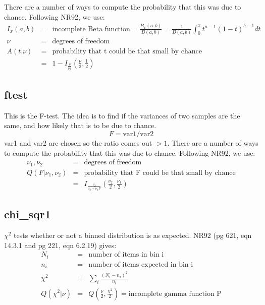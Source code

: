 There are a number of ways 
to compute the probability that this was due to chance.  Following
NR92, we use:
\begin{eqnarray}
    I_x(a,b) & = & \mbox{incomplete Beta function} 
               = \frac{B_x(a,b)}{B(a,b)}
               = \frac{1}{B(a,b)}\int_0^xt^{a-1}(1-t)^{b-1}dt\\
    \nu & = & \mbox{degrees of freedom}\\
    A(t|\nu) & = & \mbox{probability that t could be that small by chance}\\
             & = & 1- I_{\frac{\nu}{\nu_t^2}}(\frac{\nu}{2},\frac{1}{2})
\end{eqnarray}

\subsection*{ftest}
This is the F-test.  The idea is to find if the variances of two
samples are the same, and how likely that is to be due to chance.
\begin{equation}
 F = \mbox{var1} / \mbox{var2}
\end{equation}
var1 and var2 are chosen so the ratio comes out  $>1$.  There are a number of ways 
to compute the probability that this was due to chance.  Following
NR92, we use:
\begin{eqnarray}
    \nu_1,\nu_2 & = & \mbox{degrees of freedom}\\
    Q(F|\nu_1,\nu_2) & = & \mbox{probability that F could be that small by chance}\\
             & = & I_{\frac{\nu_2}{\nu_2+\nu_1F}}
                     (\frac{\nu_2}{2},\frac{\nu_1}{2})
\end{eqnarray}


\subsection*{chi\_sqr1}
$\chi^2$ tests whether or not a binned distribution is as expected.
NR92 (pg 621, eqn 14.3.1 and pg 221, eqn 6.2.19) gives:
\begin{eqnarray}
  N_i & = & \mbox{number of items in bin i}\\
  n_i & = & \mbox{number of items expected in bin i}\\
  \chi^2 & = & \sum_i\frac{(N_i-n_i)^2}{n_i}\\
  Q(\chi^2|\nu) & = & Q(\frac{\nu}{2},\frac{\chi^2}{2})
         = \mbox{incomplete gamma function P}
\end{eqnarray}


